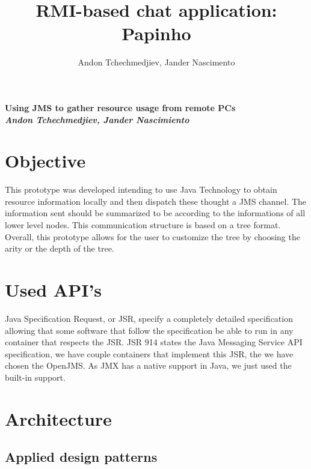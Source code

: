 \documentclass[times, 8pt,twocolumn]{article}
\title {RMI-based chat application: Papinho}
\author{Andon Tchechmedjiev, Jander Nascimento}
\begin{document}
{\Large {\bf Using JMS to gather resource usage from remote PCs}} \\
{\large {\bf {\it Andon Tchechmedjiev, Jander Nascimiento}}}
\section{Objective}
This prototype was developed intending to use Java Technology to obtain resource information locally and then dispatch these thought a JMS channel.
The information sent should be summarized to be according to the informations of all lower level nodes.
This communication structure is based on a tree format.
Overall, this prototype allows for the user to customize the tree by choosing the arity or the depth of the tree.

\section{Used API's}

Java Specification Request, or JSR, specify a completely detailed specification allowing that some software that follow the specification be able to run in any container that respects the JSR.
JSR 914 states the Java Messaging Service API specification, we have couple containers that implement this JSR, the we have chosen the OpenJMS.
As JMX has a native support in Java, we just used the built-in support. 

\section{Architecture}
\subsection{Applied design patterns}
\end{document}
